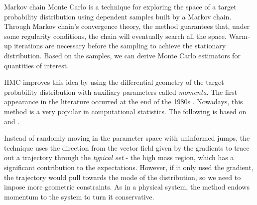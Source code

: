 Markov chain Monte Carlo is a technique for exploring the space of a
target probability distribution using dependent samples built by a Markov
chain. Through Markov chain's convergence theory, the method guarantees that,
under some regularity conditions, the chain will eventually search all the
space. Warm-up iterations are necessary before the sampling to achieve the
stationary distribution. Based on the samples, we can derive Monte Carlo 
estimators for quantities of interest. 

HMC improves this idea by using the differential geometry of the target
probability distribution with auxiliary parameters called {\em momenta}. The
first appearance in the literature occurred at the end of the 1980s
\cite[p. 3]{betancourt2017conceptual}. Nowadays, this method is a very 
popular in computational statistics. The following is based on
\textcite{betancourt2017conceptual} and \textcite{betancourt2016diagnosing}.

Instead of randomly moving in the parameter space with uninformed jumps, the
technique uses the direction from the vector field given by the gradients to
trace out a trajectory through the {\em typical set} - the high mass region, which
has a significant contribution to the expectations. However, if it only used
the gradient, the trajectory would pull towards the mode of the distribution,
so we need to impose more geometric constraints. As in a physical system, the
method endows momentum to the system to turn it conservative.

